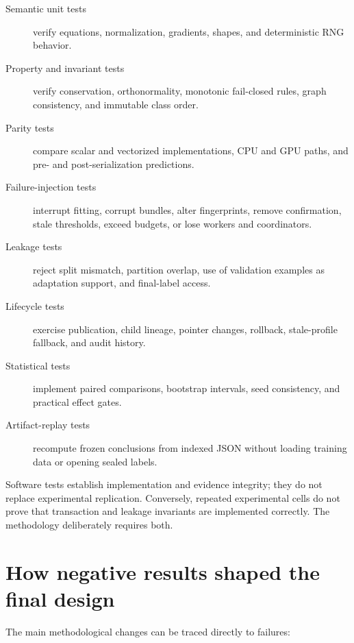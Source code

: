 \documentclass[12pt,oneside]{report}
\begin{document}
\begin{description}
\item[Semantic unit tests] verify equations, normalization, gradients, shapes,
and deterministic RNG behavior.

\item[Property and invariant tests] verify conservation, orthonormality,
monotonic fail-closed rules, graph consistency, and immutable class order.

\item[Parity tests] compare scalar and vectorized implementations, CPU and GPU
paths, and pre- and post-serialization predictions.

\item[Failure-injection tests] interrupt fitting, corrupt bundles, alter
fingerprints, remove confirmation, stale thresholds, exceed budgets, or lose
workers and coordinators.

\item[Leakage tests] reject split mismatch, partition overlap, use of
validation examples as adaptation support, and final-label access.

\item[Lifecycle tests] exercise publication, child lineage, pointer changes,
rollback, stale-profile fallback, and audit history.

\item[Statistical tests] implement paired comparisons, bootstrap intervals,
seed consistency, and practical effect gates.

\item[Artifact-replay tests] recompute frozen conclusions from indexed JSON
without loading training data or opening sealed labels.
\end{description}

Software tests establish implementation and evidence integrity; they do not
replace experimental replication. Conversely, repeated experimental cells do
not prove that transaction and leakage invariants are implemented correctly.
The methodology deliberately requires both.

\section{How negative results shaped the final design}

The main methodological changes can be traced directly to failures:
\end{document}
